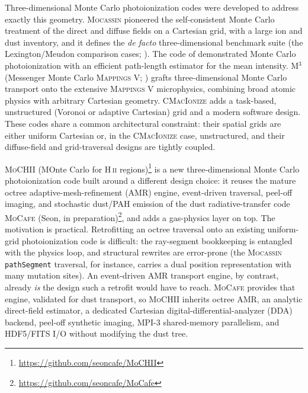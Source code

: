 \documentclass[twocolumn,linenumbers]{aastex702}
\newcommand{\code}[1]{\texttt{#1}}
\newcommand{\MoCHII}{\textsc{MoCHII}}
\newcommand{\MoCafe}{\textsc{MoCafe}}
\newcommand{\HII}{H\,\textsc{ii}}
\begin{document}
Three-dimensional Monte Carlo photoionization codes were developed to
address exactly this geometry.  \textsc{Mocassin}
\citep{ercolano2003,ercolano2005,ercolano2008} pioneered the
self-consistent Monte Carlo treatment of the direct and diffuse fields on
a Cartesian grid, with a large ion and dust inventory, and it defines the
\emph{de facto} three-dimensional benchmark suite (the Lexington/Meudon
comparison cases; \citealt{ferland1995,pequignot2001}).  The code of
\citet{wood2004} demonstrated Monte Carlo photoionization with an
efficient path-length estimator for the mean intensity.  \textsc{M}$^{3}$
(Messenger Monte Carlo \textsc{Mappings V}; \citealt{jin2022,jin2022fractal})
grafts three-dimensional Monte Carlo transport onto the extensive
\textsc{Mappings V} microphysics, combining broad atomic physics with
arbitrary Cartesian geometry.  \textsc{CMacIonize}
\citep{cmacionize2018} adds a task-based, unstructured (Voronoi or
adaptive Cartesian) grid and a modern software design.  These codes
share a common architectural constraint: their spatial grids are either
uniform Cartesian or, in the \textsc{CMacIonize} case, unstructured, and
their diffuse-field and grid-traversal designs are tightly coupled.

\MoCHII{} (MOnte Carlo for \HII{}
regions)\footnote{\url{https://github.com/seoncafe/MoCHII}} is a new
three-dimensional
Monte Carlo photoionization code built around a different design choice:
it reuses the mature octree adaptive-mesh-refinement (AMR) engine,
event-driven traversal, peel-off imaging, and stochastic dust/PAH
emission of the dust radiative-transfer code \MoCafe{} (Seon, in
preparation)\footnote{\url{https://github.com/seoncafe/MoCafe}}, and
adds a gas-physics layer on top.  The motivation is
practical.  Retrofitting an octree traversal onto an existing uniform-grid
photoionization code is difficult: the ray-segment bookkeeping is
entangled with the physics loop, and structural rewrites are error-prone
(the \textsc{Mocassin} \code{pathSegment} traversal, for instance,
carries a dual position representation with many mutation sites).  An
event-driven AMR transport engine, by contrast, already \emph{is} the
design such a retrofit would have to reach.  \MoCafe{} provides that
engine, validated for dust transport, so \MoCHII{} inherits octree AMR,
an analytic direct-field estimator, a dedicated Cartesian
digital-differential-analyzer (DDA) backend, peel-off synthetic imaging,
MPI-3 shared-memory parallelism, and HDF5/FITS I/O without modifying the
dust tree.
\end{document}
